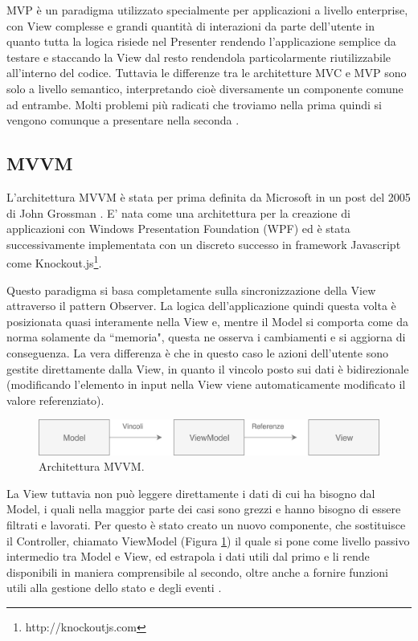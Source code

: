 \noindent
MVP è un paradigma utilizzato specialmente per applicazioni a livello enterprise, con View complesse e grandi quantità di interazioni da parte dell'utente in quanto tutta la logica risiede nel Presenter rendendo l'applicazione semplice da testare e staccando la View dal resto rendendola particolarmente riutilizzabile all'interno del codice.
Tuttavia le differenze tra le architetture MVC e MVP sono solo a livello semantico, interpretando cioè diversamente un componente comune ad entrambe. Molti problemi più radicati che troviamo nella prima quindi si vengono comunque a presentare nella seconda \cite{OsmaniOnJSFrameworks}.

\subsection{MVVM}
L'architettura MVVM è stata per prima definita da Microsoft in un post del 2005 di John Grossman \cite{GossmanOnMVVM}. E' nata come una architettura per la creazione di applicazioni con Windows Presentation Foundation (WPF) ed è stata successivamente implementata con un discreto successo in framework Javascript come Knockout.js\footnote{http://knockoutjs.com}.

Questo paradigma si basa completamente sulla sincronizzazione della View attraverso il pattern Observer. La logica dell'applicazione quindi questa volta è posizionata quasi interamente nella View e, mentre il Model si comporta come da norma solamente da “memoria", questa ne osserva i cambiamenti e si aggiorna di conseguenza. La vera differenza è che in questo caso le azioni dell'utente sono gestite direttamente dalla View, in quanto il vincolo posto sui dati è bidirezionale (modificando l'elemento in input nella View viene automaticamente modificato il valore referenziato).

\begin{figure}[h]
\centering 
\vspace*{0.5cm}
\includegraphics[width=13cm]{./images/MVVMworkflow}
\caption{Architettura MVVM.}
\label{MVVMworkflow}
\vspace*{0.5cm} 
\end{figure}

\noindent
La View tuttavia non può leggere direttamente i dati di cui ha bisogno dal Model, i quali nella maggior parte dei casi sono grezzi e hanno bisogno di essere filtrati e lavorati. Per questo è stato creato un nuovo componente, che sostituisce il Controller, chiamato ViewModel (Figura \ref{MVVMworkflow}) il quale si pone come livello passivo intermedio tra Model e View, ed estrapola i dati utili dal primo e li rende disponibili in maniera comprensibile al secondo, oltre anche a fornire funzioni utili alla gestione dello stato e degli eventi \cite{OsmaniOnJSFrameworks}.


